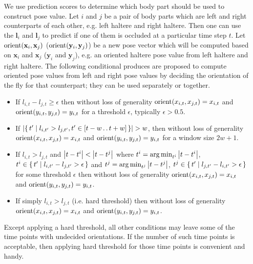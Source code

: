 We use prediction scores to determine which body part should be used to construct pose value.
Let $i$ and $j$ be a pair of body parts which are left and right counterparts of each other, e.g. left haltere and right haltere.
Then one can use the $\mathbf{l}_i$ and $\mathbf{l}_j$ to predict if one of them is occluded at a particular time step $t$.
Let $\mathop{\rm{orient}}(\mathbf{x}_i, \mathbf{x}_j)$ ($\mathop{\rm{orient}}(\mathbf{y}_i, \mathbf{y}_j)$) be a new pose vector which will be computed based on $\mathbf{x}_i$ and $\mathbf{x}_j$ ($\mathbf{y}_i$ and $\mathbf{y}_j$), e.g. an oriented haltere pose value from left haltere and right haltere.
The following conditional produces are proposed to compute oriented pose values from left and right pose values by deciding the orientation of the fly for that counterpart; they can be used separately or together.
\begin{itemize}
	\item If $l_{i,t} - l_{j,t} \geq  \epsilon$ then without loss of generality $\mathop{\rm{orient}}(x_{i,t}, x_{j,t})=x_{i,t}$ and $\mathop{\rm{orient}}(y_{i,t}, y_{j,t})=y_{i,t}$ for a threshold $\epsilon$, typically $\epsilon > 0.5$.
	\item If $\lvert\{\,t^{\prime}\mid l_{i,t^{\prime}} > l_{j,t^{\prime}}, t^{\prime} \in [t-w \mathinner {\ldotp \ldotp} t+w]\,\}\rvert > w$, then without loss of generality $\mathop{\rm{orient}}(x_{i,t}, x_{j,t})=x_{i,t}$ and $\mathop{\rm{orient}}(y_{i,t}, y_{j,t})=y_{i,t}$ for a window size $2w+1$.
	\item If $l_{i,t} > l_{j,t}$ and $\abs{t-t^i} < \abs{t-t^j}$ where $t^i=\operatorname*{arg\,min}_{t^i} \abs{t-t^i}$, $t^i \in \{\,t^{\prime}\mid l_{i,t^{\prime}} - l_{j,t^{\prime}} > \epsilon\,\}$ and $t^j=\operatorname*{arg\,min}_{t^j} \abs{t-t^j}$, $t^j \in \{\,t^{\prime}\mid l_{j,t^{\prime}} - l_{i,t^{\prime}} > \epsilon\,\}$ for some threshold $\epsilon$ then without loss of generality $\mathop{\rm{orient}}(x_{i,t}, x_{j,t})=x_{i,t}$ and $\mathop{\rm{orient}}(y_{i,t}, y_{j,t})=y_{i,t}$.
	\item If simply $l_{i,t} > l_{j,t}$ (i.e. hard threshold) then without loss of generality $\mathop{\rm{orient}}(x_{i,t}, x_{j,t})=x_{i,t}$ and $\mathop{\rm{orient}}(y_{i,t}, y_{j,t})=y_{i,t}$.
\end{itemize}
Except applying a hard threshold, all other conditions may leave some of the time points with undecided orientations.
If the number of such time points is acceptable, then applying hard threshold for those time points is convenient and handy.

